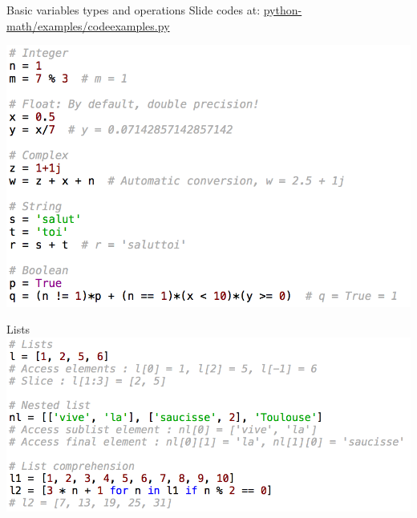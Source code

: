 \documentclass[11pt,unknownkeysallowed,usenames,dvipsnames]{beamer}
\begin{document}
    
%       
%    
%    
%    
%    
%        
\begin{frame}{Basic variables types and operations}
    Slide codes at: 
    \href{https://gitlab.unige.ch/Thibaut.Lunet/python-math/tree/master/examples/code-examples}{python-math/examples/code\-examples.py}
    
    \vspace*{5pt}
    \includegraphics[width=0.9\linewidth]{code-basic-variables}
\end{frame}



%    
%    
\begin{frame}{Lists}
    \includegraphics[width=0.9\linewidth]{code-lists}
\end{frame}
\end{document}
